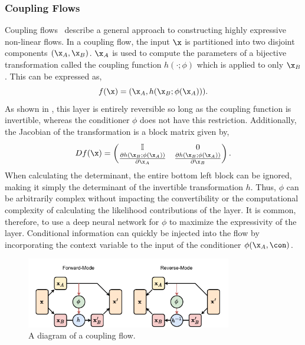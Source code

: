 \subsubsection{Coupling Flows}

Coupling flows~\cite{NICENonlinearIndependent} describe a general approach to constructing highly expressive non-linear flows.
In a coupling flow, the input $\x$ is partitioned into two disjoint components $(\x_A, \x_B)$.
$\x_A$ is used to compute the parameters of a bijective transformation called the coupling function $h(\cdot; \phi)$ which is applied to only $\x_B$.
This can be expressed as,
\begin{equation}
    \label{eq:coupling_flow}
    f(\x) = (\x_A, h(\x_B; \phi(\x_A))).
\end{equation}
As shown in , this layer is entirely reversible so long as the coupling function is invertible, whereas the conditioner $\phi$ does not have this restriction.
Additionally, the Jacobian of the transformation is a block matrix given by,
\begin{equation}
    D f(\x) = \begin{pmatrix}
        \mathbb{I} & 0 \\
        \frac{\partial h(\x_B; \phi(\x_A))}{\partial \x_A} & \frac{\partial h(\x_B; \phi(\x_A))}{\partial \x_B}
    \end{pmatrix}.
\end{equation}
When calculating the determinant, the entire bottom left block can be ignored, making it simply the determinant of the invertible transformation $h$.
Thus, $\phi$ can be arbitrarily complex without impacting the convertibility or the computational complexity of calculating the likelihood contributions of the layer.
It is common, therefore, to use a deep neural network for $\phi$ to maximize the expressivity of the layer.
Conditional information can quickly be injected into the flow by incorporating the context variable to the input of the conditioner $\phi(\x_A, \con)$.

\begin{figure}[ht]
    \centering
    \includegraphics[width=0.8\textwidth]{Figures/generative_models/coupling.pdf}
    \caption{A diagram of a coupling flow.}
    \label{fig:coupling_flow}
\end{figure}

